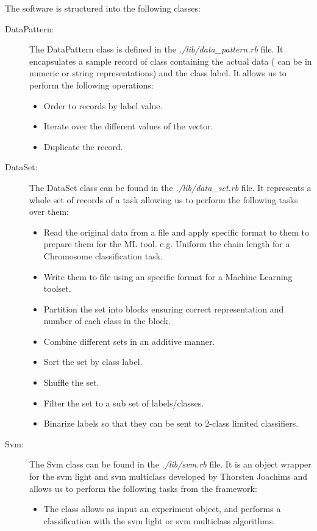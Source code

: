 \documentclass[a4paper,10pt,titlepage]{article}
\begin{document}
\par The software is structured into the following classes:
\begin{description}
	\item[DataPattern:] The DataPattern class is defined in the \textit{./lib/data\_pattern.rb} file. It encapsulates a sample record of class containing the actual data ( can be in numeric or string representations) and the class label. It allows us to perform the following operations: 
	\begin{itemize}
		\item Order to records by label value.
		\item Iterate over the different values of the vector.
		\item Duplicate the record.
	\end{itemize}
	\item[DataSet:] The DataSet class can be found in the \textit{./lib/data\_set.rb} file. It represents a whole set of records of a task allowing us to perform the following tasks over them:
	\begin{itemize}
		\item Read the original data from a file and apply specific format to them to prepare them for the ML tool. e.g. Uniform the chain length for a Chromosome classification task. 
		\item Write them to file using an specific format for a Machine Learning toolset.
		\item Partition the set into blocks ensuring correct representation and number of each class in the block.
		\item Combine different sets in an additive manner.
		\item Sort the set by class label.
		\item Shuffle the set.
		\item Filter the set to a sub set of labels/classes.
		\item Binarize labels so that they can be sent to 2-class limited classifiers. 
	\end{itemize}
	\item[Svm:] The Svm class can be found in the \textit{./lib/svm.rb} file. It is an object wrapper for the svm light and svm multiclass developed by Thorsten Joachims and allows us to perform the following tasks from the framework:
	\begin{itemize}
		\item The class allows as input an experiment object, and performs a classification with the svm light or svm multiclass algorithms. 

\end{itemize}
\end{description}
\end{document}
